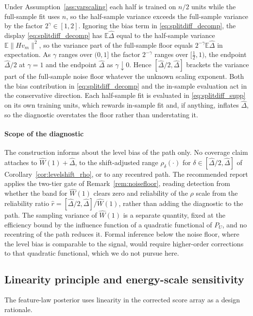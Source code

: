 \documentclass[11pt]{article}
\newcommand{\E}{\mathbb E}
\newcommand{\norm}[1]{\lVert #1\rVert}
\begin{document}
Under Assumption~\ref{ass:varscaling} each half is trained on $n/2$ units while the full-sample fit uses $n$, so the half-sample variance exceeds the full-sample variance by the factor $2^\gamma\in[1,2]$. Ignoring the bias term in \eqref{eq:splitdiff_decomp}, the display \eqref{eq:splitdiff_decomp} has $\E\widehat\Delta$ equal to the half-sample variance $\E\norm{Hv_m}^2$, so the variance part of the full-sample floor equals $2^{-\gamma}\E\widehat\Delta$ in expectation. As $\gamma$ ranges over $(0,1]$ the factor $2^{-\gamma}$ ranges over $[\tfrac12,1)$, the endpoint $\widehat\Delta/2$ at $\gamma=1$ and the endpoint $\widehat\Delta$ as $\gamma\downarrow0$. Hence $[\widehat\Delta/2,\widehat\Delta]$ brackets the variance part of the full-sample noise floor whatever the unknown scaling exponent. Both the bias contribution in \eqref{eq:splitdiff_decomp} and the in-sample evaluation act in the conservative direction. Each half-sample fit is evaluated in \eqref{eq:splitdiff_supp} on its own training units, which rewards in-sample fit and, if anything, inflates $\widehat\Delta$, so the diagnostic overstates the floor rather than understating it.

\paragraph{Scope of the diagnostic}
The construction informs about the level bias of the path only. No coverage claim attaches to $\widehat W(1)+\widehat\Delta$, to the shift-adjusted range $\rho_\delta(\cdot)$ for $\delta\in[\widehat\Delta/2,\widehat\Delta]$ of Corollary~\ref{cor:levelshift_rho}, or to any recentred path. The recommended report applies the two-tier gate of Remark~\ref{rem:noisefloor}, reading detection from whether the band for $\widehat W(1)$ clears zero and reliability of the $\rho$ scale from the reliability ratio $\hat r=[\widehat\Delta/2,\widehat\Delta]/\widehat W(1)$, rather than adding the diagnostic to the path. The sampling variance of $\widehat W(1)$ is a separate quantity, fixed at the efficiency bound by the influence function of a quadratic functional of $P_U$, and no recentring of the path reduces it. Formal inference below the noise floor, where the level bias is comparable to the signal, would require higher-order corrections to that quadratic functional, which we do not pursue here.

\subsection{Linearity principle and energy-scale sensitivity}
\label{sec:app:energy_amplification}
The feature-law posterior uses linearity in the corrected score array as a design rationale.
\end{document}
